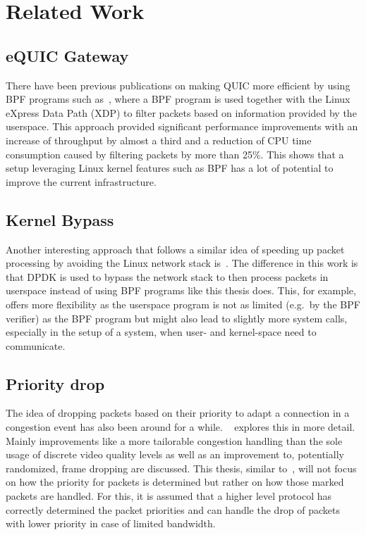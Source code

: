 \section{Related Work}\label{sec:related_work}

\subsection{eQUIC Gateway}
There have been previous publications on making QUIC more efficient by using BPF programs
such as~\parencite{equic-gateway}, where a BPF program is used together with the Linux
eXpress Data Path (XDP) to filter packets based on information provided by the userspace.
This approach provided significant performance improvements with an increase of throughput
by almost a third and a reduction of CPU time consumption caused by filtering packets by
more than 25\%.
This shows that a setup leveraging Linux kernel features such as BPF has a lot of potential
to improve the current infrastructure.

\subsection{Kernel Bypass}
Another interesting approach that follows a similar idea of speeding up packet processing
by avoiding the Linux network stack is~\parencite{kernel-bypass-msc-thesis}.
The difference in this work is that DPDK is used to bypass the network stack to 
then process packets in userspace instead of using BPF programs like this thesis does.
This, for example, offers more flexibility as the userspace program is not as limited (e.g.\ 
by the BPF verifier) as the BPF program but might also lead to slightly more system calls,
especially in the setup of a system, when user- and kernel-space need to communicate.

\subsection{Priority drop}
The idea of dropping packets based on their priority to adapt a connection
in a congestion event has also been around for a while.
~\parencite{media-streaming-prio-drop} explores this in more detail.
Mainly improvements like a more tailorable congestion handling than the sole usage
of discrete video quality levels as well as an improvement to, potentially 
randomized, frame dropping are discussed.
This thesis, similar to~\parencite{media-streaming-prio-drop}, will not focus
on how the priority for packets is determined but rather on how those marked
packets are handled.
For this, it is assumed that a higher level protocol has correctly determined 
the packet priorities and can handle the drop of packets with lower priority
in case of limited bandwidth.
